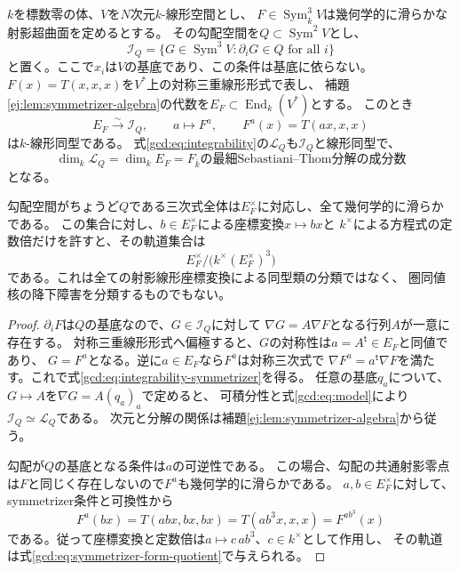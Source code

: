 \begin{proposition}[symmetrizerによる積分空間の記述]
\label{gcd:prop:integrability-symmetrizer}
$k$を標数零の体、$V$を$N$次元$k$-線形空間とし、
$F\in\operatorname{Sym}^3_kV$は幾何学的に滑らかな射影超曲面を定めるとする。
その勾配空間を$Q\subset\operatorname{Sym}^2V$とし、
\[
 \mathcal I_Q=\{G\in\operatorname{Sym}^3V:\partial_iG\in Q\text{ for all }i\}
\]
と置く。ここで$x_i$は$V$の基底であり、この条件は基底に依らない。
$F(x)=T(x,x,x)$を$V^*$上の対称三重線形形式で表し、
補題\ref{ej:lem:symmetrizer-algebra}の代数を$E_F\subset\operatorname{End}_k(V^*)$とする。
このとき
\begin{equation}\label{gcd:eq:integrability-symmetrizer}
 E_F\xrightarrow{\sim}\mathcal I_Q,\qquad
 a\longmapsto F^a,\qquad F^a(x)=T(ax,x,x)
\end{equation}
は$k$-線形同型である。
式\eqref{gcd:eq:integrability}の$\mathcal L_Q$も$\mathcal I_Q$と線形同型で、
\[
 \dim_k\mathcal L_Q=\dim_kE_F
 =\text{$F_{\overline k}$の最細Sebastiani--Thom分解の成分数}
\]
となる。

勾配空間がちょうど$Q$である三次式全体は$E_F^\times$に対応し、全て幾何学的に滑らかである。
この集合に対し、$b\in E_F^\times$による座標変換$x\mapsto bx$と
$k^\times$による方程式の定数倍だけを許すと、その軌道集合は
\begin{equation}\label{gcd:eq:symmetrizer-form-quotient}
 E_F^\times/\bigl(k^\times(E_F^\times)^3\bigr)
\end{equation}
である。これは全ての射影線形座標変換による同型類の分類ではなく、
圏同値核の降下障害を分類するものでもない。
\end{proposition}
\begin{proof}
$\partial_iF$は$Q$の基底なので、$G\in\mathcal I_Q$に対して
$\nabla G=A\nabla F$となる行列$A$が一意に存在する。
対称三重線形形式へ偏極すると、$G$の対称性は$a=A^{\mathsf t}\in E_F$と同値であり、
$G=F^a$となる。逆に$a\in E_F$なら$F^a$は対称三次式で
$\nabla F^a=a^{\mathsf t}\nabla F$を満たす。これで式\eqref{gcd:eq:integrability-symmetrizer}を得る。
任意の基底$q_a$について、$G\mapsto A$を$\nabla G=A(q_a)_a$で定めると、
可積分性と式\eqref{gcd:eq:model}により$\mathcal I_Q\simeq\mathcal L_Q$である。
次元と分解の関係は補題\ref{ej:lem:symmetrizer-algebra}から従う。

勾配が$Q$の基底となる条件は$a$の可逆性である。
この場合、勾配の共通射影零点は$F$と同じく存在しないので$F^a$も幾何学的に滑らかである。
$a,b\in E_F^\times$に対して、symmetrizer条件と可換性から
\[
 F^a(bx)=T(abx,bx,bx)=T(ab^3x,x,x)=F^{ab^3}(x)
\]
である。従って座標変換と定数倍は$a\mapsto c\,ab^3$、$c\in k^\times$として作用し、
その軌道は式\eqref{gcd:eq:symmetrizer-form-quotient}で与えられる。
\end{proof}

